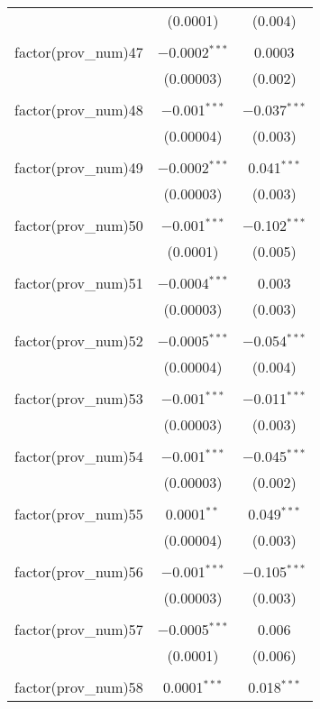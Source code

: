 \begin{table}[!htbp]
\begin{tabular}{@{\extracolsep{5pt}}lcc}
  & (0.0001) & (0.004) \\ 
  & & \\ 
 factor(prov\_num)47 & $-$0.0002$^{***}$ & 0.0003 \\ 
  & (0.00003) & (0.002) \\ 
  & & \\ 
 factor(prov\_num)48 & $-$0.001$^{***}$ & $-$0.037$^{***}$ \\ 
  & (0.00004) & (0.003) \\ 
  & & \\ 
 factor(prov\_num)49 & $-$0.0002$^{***}$ & 0.041$^{***}$ \\ 
  & (0.00003) & (0.003) \\ 
  & & \\ 
 factor(prov\_num)50 & $-$0.001$^{***}$ & $-$0.102$^{***}$ \\ 
  & (0.0001) & (0.005) \\ 
  & & \\ 
 factor(prov\_num)51 & $-$0.0004$^{***}$ & 0.003 \\ 
  & (0.00003) & (0.003) \\ 
  & & \\ 
 factor(prov\_num)52 & $-$0.0005$^{***}$ & $-$0.054$^{***}$ \\ 
  & (0.00004) & (0.004) \\ 
  & & \\ 
 factor(prov\_num)53 & $-$0.001$^{***}$ & $-$0.011$^{***}$ \\ 
  & (0.00003) & (0.003) \\ 
  & & \\ 
 factor(prov\_num)54 & $-$0.001$^{***}$ & $-$0.045$^{***}$ \\ 
  & (0.00003) & (0.002) \\ 
  & & \\ 
 factor(prov\_num)55 & 0.0001$^{**}$ & 0.049$^{***}$ \\ 
  & (0.00004) & (0.003) \\ 
  & & \\ 
 factor(prov\_num)56 & $-$0.001$^{***}$ & $-$0.105$^{***}$ \\ 
  & (0.00003) & (0.003) \\ 
  & & \\ 
 factor(prov\_num)57 & $-$0.0005$^{***}$ & 0.006 \\ 
  & (0.0001) & (0.006) \\ 
  & & \\ 
 factor(prov\_num)58 & 0.0001$^{***}$ & 0.018$^{***}$ \\ 

\end{tabular}
\end{table}
